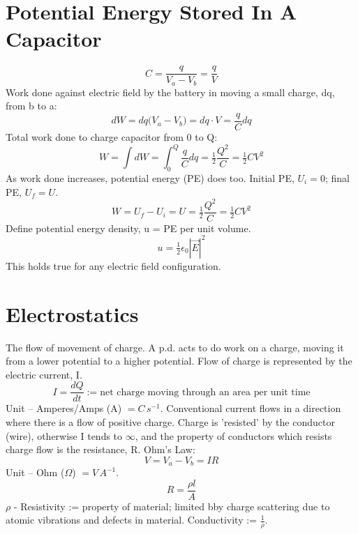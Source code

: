 \documentclass[a4paper, 11pt, normalem]{report}
\begin{document}
\section{Potential Energy Stored In A Capacitor}
\begin{equation}
    C = \frac{q}{V_{a} - V_{b}} = \frac{q}{V}
\end{equation}
Work done against electric field by the battery in moving a small charge, dq, from b to a:
\begin{equation}
    dW = dq\big(V_{a} - V_{b}\big) = dq \cdot V = \frac{q}{C}dq
\end{equation}
Total work done to charge capacitor from 0 to Q:
\begin{equation}
    W = \int dW = \int_{0}^{Q} \frac{q}{C} dq = \tfrac{1}{2} \frac{Q^{2}}{C} = \tfrac{1}{2}CV^{2}
\end{equation}
As work done increases, potential energy (PE) does too. Initial PE, $U_{i} = 0$; final PE, $U_{f} = U$.
\begin{equation}
    W = U_{f} - U_{i} = U = \tfrac{1}{2}\frac{Q^{2}}{C} = \tfrac{1}{2}CV^{2}
\end{equation}
Define potential energy density, u = PE per unit volume.
\begin{equation}
    u = \tfrac{1}{2}\epsilon_{0}|\vec{E}|^{2}
\end{equation}
This holds true for any electric field configuration.

\section{Electrostatics}
The flow of movement of charge.
A p.d. acts to do work on a charge, moving it from a lower potential to a higher potential.
Flow of charge is represented by the electric current, I.
\begin{equation}
    I = \frac{dQ}{dt} := \text{net charge moving through an area per unit time}
\end{equation}
Unit -- Amperes/Amps (A) $= C\,s^{-1}$.
Conventional current flows in a direction where there is a flow of positive charge.
Charge is 'resisted' by the conductor (wire), otherwise I tends to $\infty$, and the property of conductors which resists charge flow is the resistance, R.
Ohm's Law:
\begin{equation}
    V = V_{a} - V_{b} = IR
\end{equation}
Unit -- Ohm ($\Omega$) $= V\,A^{-1}$.
\begin{equation}
    R = \frac{\rho l}{A}
\end{equation}
$\rho$ - Resistivity := property of material; limited bby charge scattering due to atomic vibrations and defects in material.
Conductivity := $\frac{1}{\rho}$.
\end{document}
